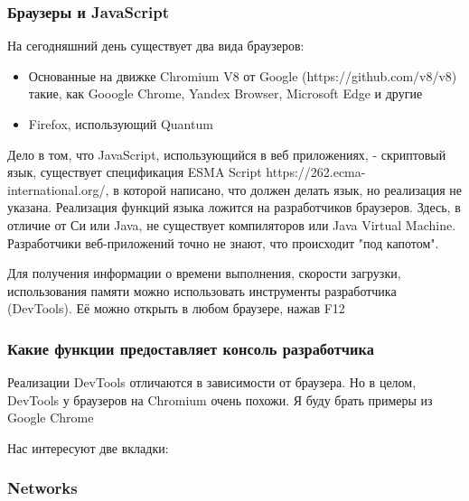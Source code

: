\documentclass[12pt]{article}
\begin{document}
\subsubsection{Браузеры и JavaScript}

На сегодняшний день существует два вида браузеров:

\begin{itemize}[label=-]
    \item Основанные на движке Chromium V8 от Google (https://github.com/v8/v8) такие,
          как Gooogle Chrome, Yandex Browser, Microsoft Edge и другие
    \item Firefox, использующий Quantum
\end{itemize}

Дело в том, что JavaScript, использующийся в веб приложениях,
- скриптовый язык, существует спецификация ESMA Script https://262.ecma-international.org/,
в которой написано, что должен делать язык, но реализация не указана.
Реализация функций языка ложится на разработчиков браузеров.
Здесь, в отличие от Си или Java, не существует компиляторов или Java Virtual Machine.
Разработчики веб-приложений точно не знают, что происходит "под капотом".

Для получения информации о времени выполнения, скорости загрузки,
использования памяти можно использовать инструменты разработчика (DevTools).
Её можно открыть в любом браузере, нажав F12

\subsubsection{Какие функции предоставляет консоль разработчика}

Реализации DevTools отличаются в зависимости от браузера.
Но в целом, DevTools у браузеров на Chromium очень похожи.
Я буду брать примеры из Google Chrome

Нас интересуют две вкладки:

\subsubsection{Networks}
\end{document}
